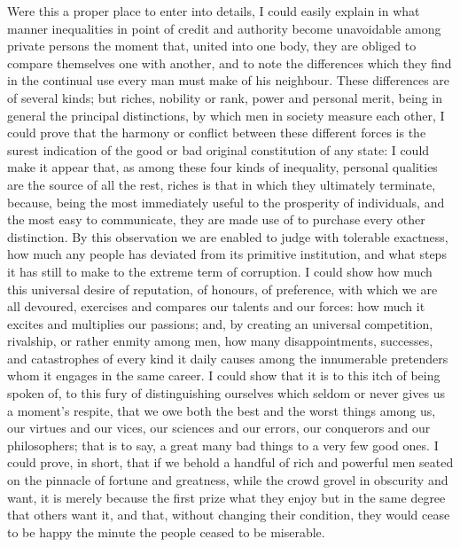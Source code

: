 \documentclass[11pt,twocolumn]{ltugboat}
\begin{document}
Were this a proper place to enter into details, I could easily explain
in what manner inequalities in point of credit and authority become
unavoidable among private persons the moment that, united into one
body, they are obliged to compare themselves one with another, and to
note the differences which they find in the continual use every man
must make of his neighbour. These differences are of several kinds;
but riches, nobility or rank, power and personal merit, being in
general the principal distinctions, by which men in society measure
each other, I could prove that the harmony or conflict between these
different forces is the surest indication of the good or bad original
constitution of any state: I could make it appear that, as among these
four kinds of inequality, personal qualities are the source of all the
rest, riches is that in which they ultimately terminate, because,
being the most immediately useful to the prosperity of individuals,
and the most easy to communicate, they are made use of to purchase
every other distinction. By this observation we are enabled to judge
with tolerable exactness, how much any people has deviated from its
primitive institution, and what steps it has still to make to the
extreme term of corruption. I could show how much this universal
desire of reputation, of honours, of preference, with which we are all
devoured, exercises and compares our talents and our forces: how much
it excites and multiplies our passions; and, by creating an universal
competition, rivalship, or rather enmity among men, how many
disappointments, successes, and catastrophes of every kind it daily
causes among the innumerable pretenders whom it engages in the same
career. I could show that it is to this itch of being spoken of, to
this fury of distinguishing ourselves which seldom or never gives us a
moment's respite, that we owe both the best and the worst things among
us, our virtues and our vices, our sciences and our errors, our
conquerors and our philosophers; that is to say, a great many bad
things to a very few good ones. I could prove, in short, that if we
behold a handful of rich and powerful men seated on the pinnacle of
fortune and greatness, while the crowd grovel in obscurity and want,
it is merely because the first prize what they enjoy but in the same
degree that others want it, and that, without changing their
condition, they would cease to be happy the minute the people ceased
to be miserable.
\end{document}
